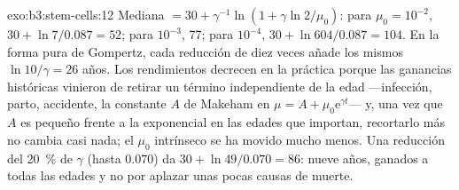 \begin{solution}{exo:b3:stem-cells:12}
Mediana $= 30 + \gamma^{-1}\ln(1 + \gamma\ln 2/\mu_{0})$: para $\mu_{0} =
10^{-2}$, $30 + \ln 7/0.087 = 52$; para $10^{-3}$, 77; para $10^{-4}$, $30 +
\ln 604/0.087 = 104$. En la forma pura de Gompertz, cada reducción de
diez veces añade los mismos $\ln 10/\gamma = 26$ años. Los rendimientos
decrecen en la práctica porque las ganancias históricas vinieron de
retirar un término independiente de la edad ---infección, parto,
accidente, la constante $A$ de Makeham en $\mu = A
+ \mu_{0}\mathrm{e}^{\gamma t}$--- y, una vez que $A$ es pequeño frente
a la exponencial en las edades que importan, recortarlo más no cambia
casi nada; el $\mu_{0}$ intrínseco se ha movido mucho menos. Una
reducción del \qty{20}{\%} de $\gamma$ (hasta $0.070$) da
$30 + \ln 49/0.070 = 86$: nueve años, ganados a todas las edades y no
por aplazar unas pocas causas de muerte.
\end{solution}

